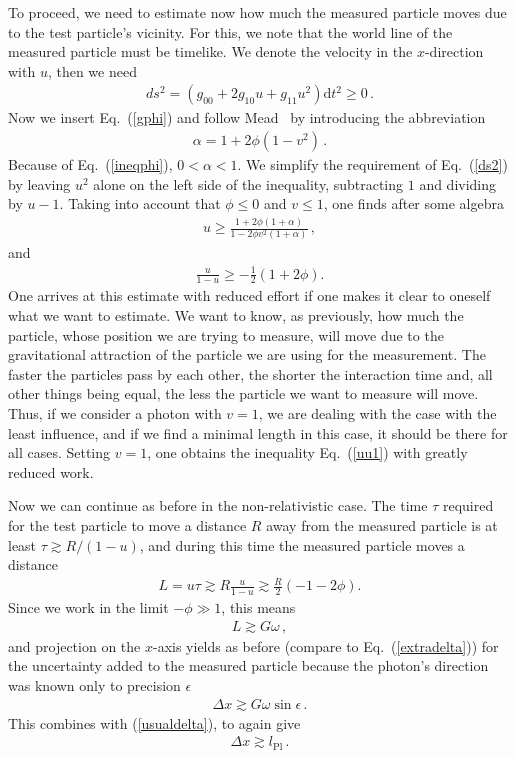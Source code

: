 \documentclass{article}
\def\beqn{\begin{eqnarray}}
\def\eeqn{\end{eqnarray}}
\begin{document}
To proceed, we need to estimate now how much the measured particle moves due to the test particle's
vicinity. For this, we note that the world line of the measured particle must be 
timelike. We denote the velocity in the $x$-direction with $u$, then
we need
\beqn
ds^2 = \left( g_{00} + 2 g_{10} u + g_{11} u^2 \right) \mathrm{d}t^2 \geq 0 \,. \label{ds2}
\eeqn
Now we insert Eq.~(\ref{gphi}) and follow Mead~\cite{Mead} by introducing the abbreviation
\beqn
\alpha = 1 + 2\phi (1-v^2) \,.
\eeqn
Because of Eq.~(\ref{ineqphi}), $0 < \alpha < 1$. We simplify the requirement of Eq.~(\ref{ds2}) 
by leaving $u^2$ alone on the left side of the inequality, subtracting $1$ and dividing by $u-1$. Taking
into account that $\phi \leq 0$ and $v \leq 1$, one finds after some algebra
\beqn
u \geq \frac{1+2 \phi (1+\alpha)}{1-2\phi v^2(1+\alpha)} \,, 
\eeqn
and
\beqn
\frac{u}{1-u} \geq - \frac{1}{2} \left(1 + 2 \phi \right) . \label{uu1}
\eeqn
One arrives at this estimate with reduced effort if one makes it clear to oneself what we want to estimate. 
We want to know,
as previously, how much the particle, whose position we are trying to measure, will move due to the gravitational
attraction of the particle we are using for the measurement. The faster the particles pass by each other, the
shorter the interaction time and, all other things being equal, the less the particle we want to measure
will move. Thus, if we consider a photon with $v=1$, we are dealing with the case with the least influence, and
if we find a minimal length in this case, it should be there for all cases. Setting $v=1$, one obtains the
inequality Eq.~(\ref{uu1}) with greatly reduced work.

Now we can continue as before in the non-relativistic case. The time $\tau$ required for the test particle to move a distance
$R$ away from the measured particle is at least $\tau \gtrsim R/(1-u)$, and during this time the measured particle
moves a distance
\beqn
L = u \tau \gtrsim R \frac{u}{1-u} \gtrsim \frac{R}{2} \left(-1 - 2 \phi \right) .
\eeqn
Since we work in the limit $- \phi \gg 1$, this means
\beqn
L \gtrsim G \omega \,, \label{meadl}
\eeqn
and projection on the $x$-axis yields as before (compare to Eq.~(\ref{extradelta})) for the uncertainty added to the measured particle
because the photon's direction was known only to precision $\epsilon$
\beqn
\Delta x \gtrsim G \omega \sin \epsilon \,.
\eeqn
This combines with (\ref{usualdelta}), to again give
\beqn
\Delta x \gtrsim l_{\mathrm{Pl}} \,.
\eeqn
\end{document}
